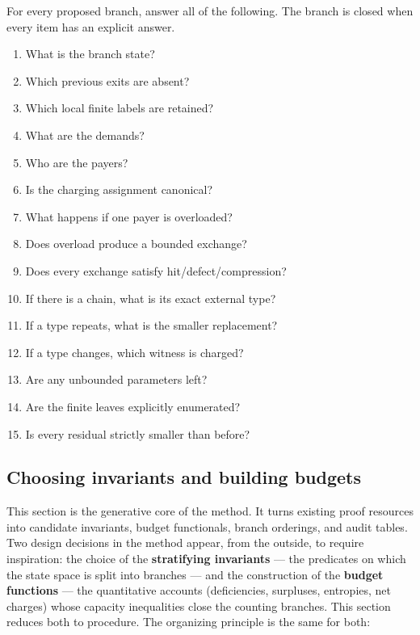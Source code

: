 \documentclass[
  11pt,
]{article}
\providecommand{\tightlist}{%
  \setlength{\itemsep}{0pt}\setlength{\parskip}{0pt}}
\theoremstyle{definition}
\begin{document}
For every proposed branch, answer all of the following. The branch is
closed when every item has an explicit answer.

\begin{enumerate}
\def\labelenumi{\arabic{enumi}.}
\tightlist
\item
  What is the branch state?
\item
  Which previous exits are absent?
\item
  Which local finite labels are retained?
\item
  What are the demands?
\item
  Who are the payers?
\item
  Is the charging assignment canonical?
\item
  What happens if one payer is overloaded?
\item
  Does overload produce a bounded exchange?
\item
  Does every exchange satisfy hit/defect/compression?
\item
  If there is a chain, what is its exact external type?
\item
  If a type repeats, what is the smaller replacement?
\item
  If a type changes, which witness is charged?
\item
  Are any unbounded parameters left?
\item
  Are the finite leaves explicitly enumerated?
\item
  Is every residual strictly smaller than before?
\end{enumerate}



\subsection{Choosing invariants and building
budgets}\label{choosing-invariants-and-building-budgets}

This section is the generative core of the method. It turns existing
proof resources into candidate invariants, budget functionals, branch
orderings, and audit tables. Two design decisions in the method appear,
from the outside, to require inspiration: the choice of the
\textbf{stratifying invariants} --- the predicates on which the state
space is split into branches --- and the construction of the
\textbf{budget functions} --- the quantitative accounts (deficiencies,
surpluses, entropies, net charges) whose capacity inequalities close the
counting branches. This section reduces both to procedure. The
organizing principle is the same for both:
\end{document}
